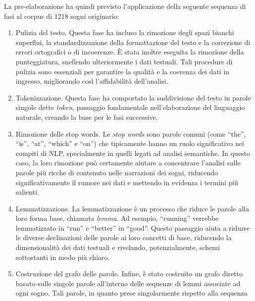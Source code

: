 La pre-elaborazione ha quindi previsto l'applicazione della seguente sequenza di fasi al corpus di 1218 sogni
originario:
\begin{enumerate}
    \item Pulizia del testo. \newline \noindent
          Questa fase ha incluso la rimozione degli spazi bianchi superflui, la standardizzazione della
          formattazione del testo e la correzione di errori ortografici o di incoerenze. È stata inoltre eseguita la
          rimozione della punteggiatura, snellendo ulteriormente i dati testuali. Tali procedure di pulizia sono
          essenziali per garantire la qualità e la coerenza dei dati in ingresso, migliorando così l'affidabilità
          dell'analisi.
    \item Tokenizzazione. \newline \noindent
          Questa fase ha comportato la suddivisione del testo in parole singole dette \textit{token},
          passaggio fondamentale nell'elaborazione del linguaggio naturale, creando la base per le fasi successive.
    \item Rimozione delle stop words. \newline \noindent
          Le \textit{stop words} sono parole comuni (come ``the'', ``is'', ``at'', ``which'' e ``on'') che tipicamente
          hanno un ruolo significativo nei compiti di NLP, specialmente in quelli legati ad analisi semantiche.
          In questo caso, la loro rimozione può certamente aiutare a concentrare l'analisi sulle parole più ricche di
          contenuto nelle narrazioni dei sogni, riducendo significativamente il rumore nei dati e mettendo in evidenza
          i termini più salienti.
    \item Lemmatizzazione. \newline \noindent
          La lemmatizzazione è un processo che riduce le parole alla loro forma base, chiamata \textit{lemma}.
          Ad esempio, ``running'' verrebbe lemmatizzato in ``run'' e ``better'' in ``good''.
          Questo passaggio aiuta a ridurre le diverse declinazioni delle parole ai loro concetti di base, riducendo
          la dimensionalità dei dati testuali e rivelando, potenzialmente, schemi sottostanti in modo più chiaro.
    \item Costruzione del grafo delle parole. \newline \noindent
          Infine, è stato costruito un grafo diretto basato sulle singole parole all'interno delle sequenze
          di lemmi associate ad ogni sogno. Tali parole, in quanto prese singolarmente rispetto alla sequenza

\end{enumerate}
